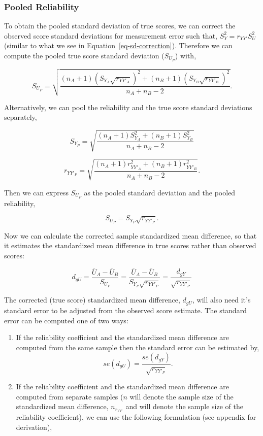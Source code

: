 \documentclass[
  letterpaper,
  DIV=11,
  numbers=noendperiod]{scrreprt}
\providecommand{\tightlist}{%
  \setlength{\itemsep}{0pt}\setlength{\parskip}{0pt}}\usepackage{longtable,booktabs,array}
\begin{document}
\subsubsection*{Pooled Reliability}\label{pooled-reliability}

To obtain the pooled standard deviation of true scores, we can correct
the observed score standard deviations for measurement error such that,
\(S^2_{Y}=r_{YY'}S^2_{U}\) (similar to what we see in
Equation~\ref{eq-sd-correction}). Therefore we can compute the pooled
true score standard deviation (\(S_{U_P}\)) with,

\[
S_{U_P} = \sqrt{\frac{(n_A+1)\left(S_{Y_A} \sqrt{r_{YY'_A}}\right)^2+(n_B+1)\left(S_{Y_B} \sqrt{r_{YY'_B}}\right)^2}{n_A + n_B - 2}}.
\]

Alternatively, we can pool the reliability and the true score standard
deviations separately,

\[
S_{Y_P} = \sqrt{\frac{(n_A+1)S_{Y_A}^2+(n_B+1)S_{Y_B}^2}{n_A + n_B - 2}}
\]

\[
r_{YY'_P} = \sqrt{\frac{(n_A+1) r_{YY'_A}^2+(n_B+1)r_{YY'_B}^2}{n_A + n_B - 2}}.
\]

Then we can express \(S_{U_P}\) as the pooled standard deviation and the
pooled reliability,

\[
S_{U_P} = S_{Y_P}\sqrt{r_{YY'_P}}.
\]

Now we can calculate the corrected sample standardized mean difference,
so that it estimates the standardized mean difference in true scores
rather than observed scores:

\[
d_{gU} = \frac{\overline{U}_A - \overline{U}_B}{S_{U_P}} =  \frac{\overline{U}_A - \overline{U}_B}{S_{Y_P}\sqrt{r_{YY'_P}}} = \frac{d_{gY}}{\sqrt{r_{YY'_P}}}
\]

The corrected (true score) standardized mean difference, \(d_{gU}\),
will also need it's standard error to be adjusted from the observed
score estimate. The standard error can be computed one of two ways:

\begin{enumerate}
\def\labelenumi{\arabic{enumi}.}
\tightlist
\item
  If the reliability coefficient and the standardized mean difference
  are computed from the same sample then the standard error can be
  estimated by, \[
  se(d_{gU}) = \frac{se(d_{gY})}{\sqrt{r_{YY'_P}}}.
  \]
\item
  If the reliability coefficient and the standardized mean difference
  are computed from separate samples (\(n\) will denote the sample size
  of the standardized mean difference, \(n_{r_{YY'}}\) and will denote
  the sample size of the reliability coefficient), we can use the
  following formulation (see appendix for derivation),
\end{enumerate}
\end{document}
